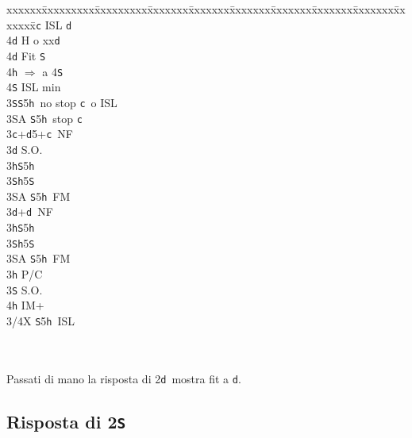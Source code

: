 \documentclass[a4paper,italian]{article}
\newcommand{\BS}{\small{\texttt{S}}}
\newcommand{\BC}{\small{\texttt{c}}}
\newcommand{\BD}{\small{\texttt{d}}}
\newcommand{\BH}{\small{\texttt{h}}}
\newcommand{\pdfs}{\texorpdfstring{\texttt{S}}{S}}
\newenvironment{bidtable}
{\begin{tabbing}

    xxxxxx\=xxxxxxxxx\=xxxxxxxxx\=xxxxxxx\=xxxxxxx\=xxxxxxx\=xxxxxxx\=xxxxxxx\=xxxxxxx\=xxxxxxx\=\kill}
{\end{tabbing} }%
\begin{document}
\begin{multicols}{2}
\begin{bidtable}
        4\BC \> ISL \BD \+\\
        4\BD \> H o xx\BD \-\\
        4\BD \> Fit \BS \+\\
        4\BH \> $\Rightarrow$ a 4\BS \+\\
        4\BS \> ISL min\-\-\-\\
        3\BS {}\BS 5\BH\ no stop \BC\ o ISL\\
        3\small{SA} \BS 5\BH\ stop \BC \-\\
        3\BC {}+\BD 5+\BC\ NF\+\\
        3\BD \> S.O.\\
        3\BH {}\BS 5\BH \\
        3\BS {}\BH 5\BS \\
        3\small{SA} \BS 5\BH\ FM\-\\
        3\BD {}+\BD\ NF\+\\
        3\BH {}\BS 5\BH \\
        3\BS {}\BH 5\BS \\
        3\small{SA} \BS 5\BH\ FM\-\\
        3\BH \> P/C\+\\
        3\BS \> S.O.\\
        4\BH \> IM+\\
        3/4X \BS 5\BH\ ISL\-\\
        \\
        \\
    \end{bidtable}
    Passati di mano la risposta di 2\BD\ mostra fit a \BD.
\end{multicols}

\subsection{Risposta di 2\pdfs}
\end{document}
